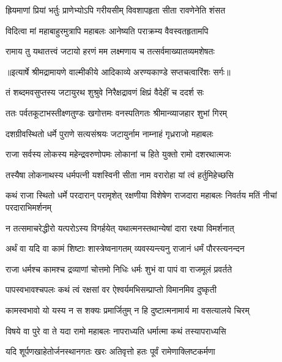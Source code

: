 \twolineshloka
{ह्रियमाणां प्रियां भर्तुः प्राणेभ्योऽपि गरीयसीम्}
{विवशापहृता सीता रावणेनेति शंसत} %

\twolineshloka
{विदित्वा मां महाबाहुरमुत्रापि महाबलः}
{आनेष्यति पराक्रम्य वैवस्वतहृतामपि} %

\twolineshloka
{रामाय तु यथातत्त्वं जटायो हरणं मम}
{लक्ष्मणाय च तत्सर्वमाख्यातव्यमशेषतः} %


{॥इत्यार्षे श्रीमद्रामायणे वाल्मीकीये आदिकाव्ये अरण्यकाण्डे सप्तचत्वारिंशः सर्गः॥}


\twolineshloka
{तं शब्दमवसुप्तस्य जटायुरथ शुश्रुवे}
{निरैक्षद्रावणं क्षिप्रं वैदेहीं च ददर्श सः} %

\twolineshloka
{ततः पर्वतकूटाभस्तीक्ष्णतुण्डः खगोत्तमः}
{वनस्पतिगतः श्रीमान्व्याजहार शुभां गिरम्} %

\twolineshloka
{दशग्रीवस्थितो धर्मे पुराणे सत्यसंश्रयः}
{जटायुर्नाम नाम्नाहं गृध्रराजो महाबलः} %

\twolineshloka
{राजा सर्वस्य लोकस्य महेन्द्रवरुणोपमः}
{लोकानां च हिते युक्तो रामो दशरथात्मजः} %

\twolineshloka
{तस्यैषा लोकनाथस्य धर्मपत्नी यशस्विनी}
{सीता नाम वरारोहा यां त्वं हर्तुमिहेच्छसि} %

\threelineshloka
{कथं राजा स्थितो धर्मे परदारान् परामृशेत्}
{रक्षणीया विशेषेण राजदारा महाबलः}
{निवर्तय मतिं नीचां परदाराभिमर्शनम्} %

\twolineshloka
{न तत्समाचरेद्धीरो यत्परोऽस्य विगर्हयेत्}
{यथात्मनस्तथान्येषां दारा रक्ष्या विमर्शनात्} %

\twolineshloka
{अर्थं वा यदि वा कामं शिष्टाः शास्त्रेष्वनागतम्}
{व्यवस्यन्त्यनु राजानं धर्मं पौरस्त्यनन्दन} %

\twolineshloka
{राजा धर्मश्च कामश्च द्रव्याणां चोत्तमो निधिः}
{धर्मः शुभं वा पापं वा राजमूलं प्रवर्तते} %

\twolineshloka
{पापस्वभावश्चपलः कथं त्वं रक्षसां वर}
{ऐश्वर्यमभिसम्प्राप्तो विमानमिव दुष्कृती} %

\twolineshloka
{कामस्वभावो यो यस्य न स शक्यः प्रमार्जितुम्}
{न हि दुष्टात्मनामार्य मा वसत्यालये चिरम्} %

\twolineshloka
{विषये वा पुरे वा ते यदा रामो महाबलः}
{नापराध्यति धर्मात्मा कथं तस्यापराध्यसि} %

\twolineshloka
{यदि शूर्पणखाहेतोर्जनस्थानगतः खरः}
{अतिवृत्तो हतः पूर्वं रामेणाक्लिष्टकर्मणा} %

